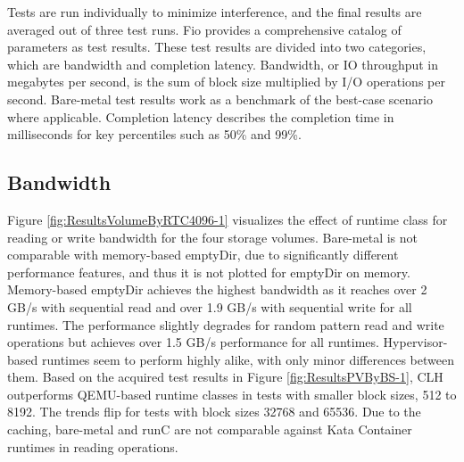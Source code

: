 Tests are run individually to minimize interference, and the final results are averaged out of three test runs. Fio provides a comprehensive catalog of parameters as test results. These test results are divided into two categories, which are bandwidth and completion latency. Bandwidth, or IO throughput in megabytes per second, is the sum of block size multiplied by I/O operations per second. Bare-metal test results work as a benchmark of the best-case scenario where applicable. Completion latency describes the completion time in milliseconds for key percentiles such as 50\% and 99\%. 

\subsection{Bandwidth}

Figure \ref{fig:ResultsVolumeByRTC4096-1} visualizes the effect of runtime class for reading or write bandwidth for the four storage volumes. Bare-metal is not comparable with memory-based emptyDir, due to significantly different performance features, and thus it is not plotted for emptyDir on memory. Memory-based emptyDir achieves the highest bandwidth as it reaches over 2 GB/s with sequential read and over 1.9 GB/s with sequential write for all runtimes. The performance slightly degrades for random pattern read and write operations but achieves over 1.5 GB/s performance for all runtimes. Hypervisor-based runtimes seem to perform highly alike, with only minor differences between them. Based on the acquired test results in Figure \ref{fig:ResultsPVByBS-1}, CLH outperforms QEMU-based runtime classes in tests with smaller block sizes, 512 to 8192. The trends flip for tests with block sizes 32768 and 65536. Due to the caching, bare-metal and runC are not comparable against Kata Container runtimes in reading operations.

